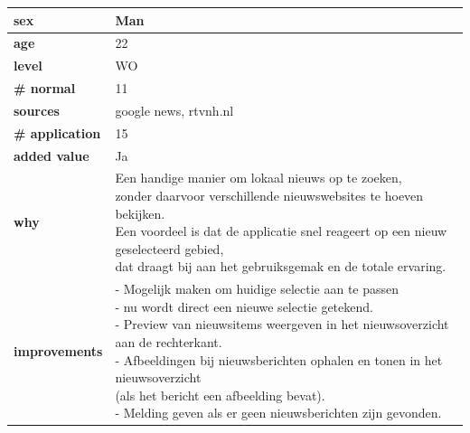 \documentclass[twoside,openright]{uva-bachelor-thesis}
\begin{document}
\begin{table}
	\centering
	\begin{tabular}{|l|l|}
		\hline
		\textbf{sex} & Man \\ \hline
		\textbf{age} & 22 \\ \hline
		\textbf{level} & WO \\ \hline
		\textbf{\# normal} & 11 \\ \hline
		\textbf{sources} & google news, rtvnh.nl
		\\ \hline
		\textbf{\# application} & 15 \\ \hline
		\textbf{added value} & Ja \\ \hline
		\textbf{why} & \pbox{20cm}{Een handige manier om lokaal nieuws op te zoeken,\\ zonder daarvoor verschillende nieuwswebsites te hoeven bekijken.\\ Een voordeel is dat de applicatie snel reageert op een nieuw geselecteerd gebied, \\dat draagt bij aan het gebruiksgemak en de totale ervaring.}
		
		
		
		
		\\ \hline
		
		\textbf{improvements} & \pbox{20cm}{- Mogelijk maken om huidige selectie aan te passen \\- nu wordt direct een nieuwe selectie getekend.
		\\- Preview van nieuwsitems weergeven in het nieuwsoverzicht aan de rechterkant.
		\\- Afbeeldingen bij nieuwsberichten ophalen en tonen in het nieuwsoverzicht\\ (als het bericht een afbeelding bevat).
		\\- Melding geven als er geen nieuwsberichten zijn gevonden.
		}
		
		
		
		\\ \hline
	\end{tabular}
\end{table}
\end{document}
